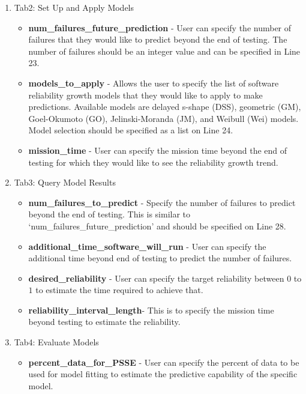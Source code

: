 \documentclass[journal]{IEEEtran}
\begin{document}
\begin{itemize}
{\begin{enumerate}
{\begin{itemize}
    \end{itemize}
    }
    \item {Tab2: Set Up and Apply Models
    \begin{itemize}
      \item {\textbf{num\_failures\_future\_prediction} - User can specify the number of failures that they would like to predict beyond the end of testing. The number of failures should be an integer value and can be specified in Line 23.}
      \item {\textbf{models\_to\_apply} - Allows the user to specify the list of software reliability growth models that they would like to apply to make predictions. Available models are delayed s-shape (DSS), geometric (GM), Goel-Okumoto (GO), Jelinski-Moranda (JM), and Weibull (Wei) models. Model selection should be specified as a list on Line 24. }
      \item {\textbf{mission\_time} - User can specify the mission time beyond the end of testing for which they would like to see the reliability growth trend.}
    \end{itemize}
    }
    \item {Tab3: Query Model Results
    \begin{itemize}
      \item {\textbf{num\_failures\_to\_predict} - Specify the number of failures to predict beyond the end of testing. This is similar to `num\_failures\_future\_prediction' and should be specified on Line 28.}
      \item {\textbf{additional\_time\_software\_will\_run} - User can specify the additional time beyond end of testing to predict the number of failures. }
      \item {\textbf{desired\_reliability} - User can specify the target reliability between $0$ to $1$ to estimate the time required to achieve that.}
      \item {\textbf{reliability\_interval\_length}- This is to specify the mission time beyond testing to estimate the reliability.}
    \end{itemize}
    }
    \item {Tab4: Evaluate Models
    \begin{itemize}
    \item{\textbf{percent\_data\_for\_PSSE} - User can specify the percent of data to be used for model fitting to estimate the predictive capability of the specific model.}
    \end{itemize}
    }
  \end{enumerate}
  }
  

\end{itemize}
\end{document}
